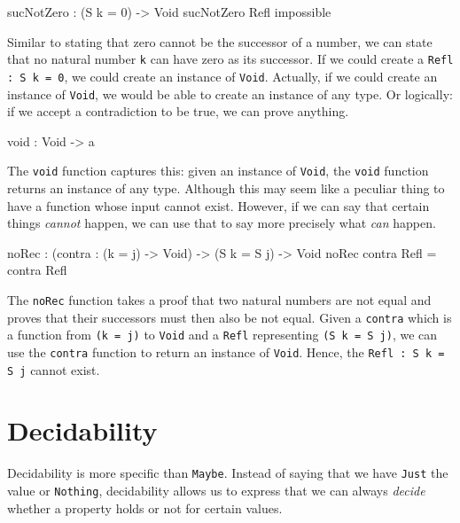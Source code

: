     \begin{code}[label={des:snz}, caption={The successor of a natural number cannot be zero}]
            sucNotZero : (S k = 0) -> Void
            sucNotZero Refl impossible
    \end{code}
    Similar to stating that zero cannot be the successor of a number, we can state that no natural number \texttt{k} can have zero as its successor. If we could create a \texttt{Refl : S k = 0}, we could create an instance of \texttt{Void}. Actually, if we could create an instance of \texttt{Void}, we would be able to create an instance of any type. Or logically: if we accept a contradiction to be true, we can prove anything.


    \begin{code}[caption={The \texttt{void} function}]
            void : Void -> a
    \end{code}
    
    The \texttt{void} function captures this: given an instance of \texttt{Void}, the \texttt{void} function returns an instance of any type. Although this may seem like a peculiar thing to have a function whose input cannot exist. However, if we can say that certain things \textit{cannot} happen, we can use that to say more precisely what \textit{can} happen.
        
    \begin{code}[label={des:no-rec}, caption={Applying a function to an impossibility does not make it possible}]
            noRec : (contra : (k = j) -> Void) -> (S k = S j) -> Void
            noRec contra Refl = contra Refl
    \end{code}
        
    The \texttt{noRec} function takes a proof that two natural numbers are not equal and proves that their successors must then also be not equal. Given a \texttt{contra} which is a function from \texttt{(k = j)} to \texttt{Void} and a \texttt{Refl} representing \texttt{(S k = S j)}, we can use the \texttt{contra} function to return an instance of \texttt{Void}. Hence, the\linebreak
    \texttt{Refl : S k = S j} cannot exist.

\section{Decidability}
    Decidability is more specific than \texttt{Maybe}. Instead of saying that we have \texttt{Just} the value or \texttt{Nothing}, decidability allows us to express that we can always \textit{decide} whether a property holds or not for certain values.
        
